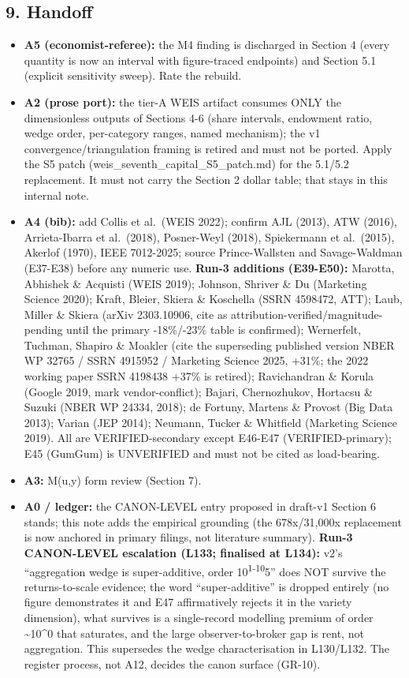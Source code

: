 \documentclass[
  11pt,
]{article}
\providecommand{\tightlist}{%
  \setlength{\itemsep}{0pt}\setlength{\parskip}{0pt}}
\begin{document}
\subsection{9. Handoff}\label{handoff}

\begin{itemize}
\tightlist
\item
  \textbf{A5 (economist-referee):} the M4 finding is discharged in
  Section 4 (every quantity is now an interval with figure-traced
  endpoints) and Section 5.1 (explicit sensitivity sweep). Rate the
  rebuild.
\item
  \textbf{A2 (prose port):} the tier-A WEIS artifact consumes ONLY the
  dimensionless outputs of Sections 4-6 (share intervals, endowment
  ratio, wedge order, per-category ranges, named mechanism); the v1
  convergence/triangulation framing is retired and must not be ported.
  Apply the S5 patch (weis\_seventh\_capital\_S5\_patch.md) for the
  5.1/5.2 replacement. It must not carry the Section 2 dollar table;
  that stays in this internal note.
\item
  \textbf{A4 (bib):} add Collis et al.~(WEIS 2022); confirm AJL (2013),
  ATW (2016), Arrieta-Ibarra et al.~(2018), Posner-Weyl (2018),
  Spiekermann et al.~(2015), Akerlof (1970), IEEE 7012-2025; source
  Prince-Wallsten and Savage-Waldman (E37-E38) before any numeric use.
  \textbf{Run-3 additions (E39-E50):} Marotta, Abhishek \& Acquisti
  (WEIS 2019); Johnson, Shriver \& Du (Marketing Science 2020); Kraft,
  Bleier, Skiera \& Koschella (SSRN 4598472, ATT); Laub, Miller \&
  Skiera (arXiv 2303.10906, cite as
  attribution-verified/magnitude-pending until the primary -18\%/-23\%
  table is confirmed); Wernerfelt, Tuchman, Shapiro \& Moakler (cite the
  superseding published version NBER WP 32765 / SSRN 4915952 / Marketing
  Science 2025, +31\%; the 2022 working paper SSRN 4198438 +37\% is
  retired); Ravichandran \& Korula (Google 2019, mark vendor-conflict);
  Bajari, Chernozhukov, Hortacsu \& Suzuki (NBER WP 24334, 2018); de
  Fortuny, Martens \& Provost (Big Data 2013); Varian (JEP 2014);
  Neumann, Tucker \& Whitfield (Marketing Science 2019). All are
  VERIFIED-secondary except E46-E47 (VERIFIED-primary); E45 (GumGum) is
  UNVERIFIED and must not be cited as load-bearing.
\item
  \textbf{A3:} M(u,y) form review (Section 7).
\item
  \textbf{A0 / ledger:} the CANON-LEVEL entry proposed in draft-v1
  Section 6 stands; this note adds the empirical grounding (the
  678x/31,000x replacement is now anchored in primary filings, not
  literature summary). \textbf{Run-3 CANON-LEVEL escalation (L133;
  finalised at L134):} v2's ``aggregation wedge is super-additive, order
  10\textsuperscript{1-10}5'' does NOT survive the returns-to-scale
  evidence; the word ``super-additive'' is dropped entirely (no figure
  demonstrates it and E47 affirmatively rejects it in the variety
  dimension), what survives is a single-record modelling premium of
  order \textasciitilde10\^{}0 that saturates, and the large
  observer-to-broker gap is rent, not aggregation. This supersedes the
  wedge characterisation in L130/L132. The register process, not A12,
  decides the canon surface (GR-10).
\end{itemize}
\end{document}
